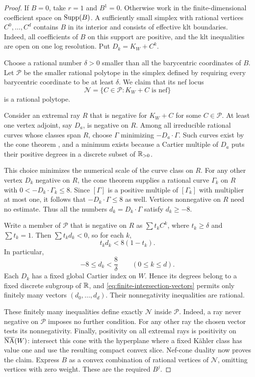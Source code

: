 \begin{proof}
If $B=0$, take $r=1$ and $B^1=0$.  Otherwise work in the finite-dimensional
coefficient space on $\operatorname{Supp}(B)$.  A sufficiently small simplex with
rational vertices $C^0,\ldots,C^d$ contains $B$ in its interior and
consists of effective klt boundaries.  Indeed, all coefficients of $B$
on this support are positive, and the klt inequalities are open on one
log resolution.  Put $D_k=K_W+C^k$.

Choose a rational number $\delta>0$ smaller than all the barycentric
coordinates of $B$.  Let $\mathcal P$ be the smaller rational polytope
in the simplex defined by requiring every barycentric coordinate to
be at least $\delta$.  We claim that its nef locus
\[
 \mathcal N=\{C\in\mathcal P:K_W+C\text{ is nef}\}
\]
is a rational polytope.

Consider an extremal ray $R$ that is negative for $K_W+C$ for some
$C\in\mathcal P$.  At least one vertex adjoint, say $D_a$, is negative
on $R$.  Among all irreducible rational curves whose classes span $R$,
choose $\Gamma$ minimizing $-D_a\cdot\Gamma$.  Such curves exist by the
cone theorem \cite[Theorem~1.3]{HX2026}, and a minimum exists because
a Cartier multiple of $D_a$ puts their positive degrees in a discrete
subset of $\mathbb R_{>0}$.

This choice minimizes the numerical scale of the curve class on $R$.
For any other vertex $D_k$ negative on $R$, the cone theorem supplies
a rational curve $\Gamma_k$ on $R$ with
$0<-D_k\cdot\Gamma_k\le8$.  Since $[\Gamma]$ is a positive multiple
of $[\Gamma_k]$ with multiplier at most one, it follows that
$-D_k\cdot\Gamma\le8$ as well.  Vertices nonnegative on $R$ need no
estimate.  Thus all the numbers $d_k=D_k\cdot\Gamma$ satisfy $d_k\ge-8$.

Write a member of $\mathcal P$ that is negative on $R$ as
$\sum t_kC^k$, where $t_k\ge\delta$ and $\sum t_k=1$.  Then
$\sum t_kd_k<0$, so for each $k$,
\[
 t_kd_k<8(1-t_k).
\]
In particular,
\begin{equation}
 -8\le d_k<\frac8\delta\qquad(0\le k\le d).
 \label{eq:finite-intersection-vectors}
\end{equation}
Each $D_k$ has a fixed global Cartier index on $W$.  Hence its degrees
belong to a fixed discrete subgroup of $\mathbb R$, and
\eqref{eq:finite-intersection-vectors} permits only finitely many
vectors $(d_0,\ldots,d_d)$.  Their nonnegativity inequalities are rational.

These finitely many inequalities define exactly $\mathcal N$ inside
$\mathcal P$.  Indeed, a ray never negative on $\mathcal P$ imposes
no further condition.  For any other ray the chosen vector tests its
nonnegativity.  Finally, positivity on all extremal rays is positivity
on $\overline{\mathrm{NA}}(W)$: intersect this cone with the hyperplane where a fixed
Kähler class has value one and use the resulting compact convex slice.
Nef-cone duality now proves the claim.  Express $B$ as a convex
combination of rational vertices of $\mathcal N$, omitting vertices
with zero weight.  These are the required $B^j$.
\end{proof}

